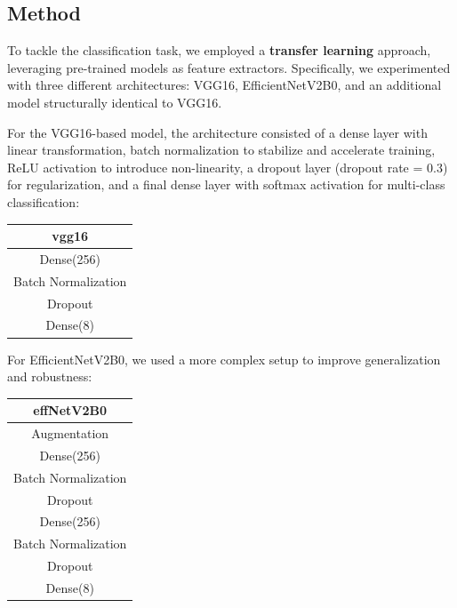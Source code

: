 \documentclass[11pt]{article}
\begin{document}
\begin{multicols*}{2}

        \section{Method}
        
        To tackle the classification task, we employed a \textbf{transfer learning} approach, leveraging pre-trained models as feature extractors. Specifically, we experimented with three different architectures: VGG16, EfficientNetV2B0, and an additional model structurally identical to VGG16.
        
        For the VGG16-based model, the architecture consisted of a dense layer with linear transformation, batch normalization to stabilize and accelerate training, ReLU activation to introduce non-linearity, a dropout layer (dropout rate = 0.3) for regularization, and a final dense layer with softmax activation for multi-class classification:

        \begin{center}
        \begin{tabular}{c}
        \toprule
        vgg16\\
        \hline
        Dense(256)\\
        Batch Normalization\\
        Dropout\\
        Dense(8)\\
        \bottomrule
        \end{tabular}
        \end{center}

        For EfficientNetV2B0, we used a more complex setup to improve generalization and robustness:

        \begin{center}
        \begin{tabular}{c}
        \toprule
        effNetV2B0\\
        \hline
        Augmentation\\
        Dense(256)\\
        Batch Normalization\\
        Dropout\\
        Dense(256)\\
        Batch Normalization\\
        Dropout\\
        Dense(8)\\
        \bottomrule
        \end{tabular}
        \end{center}
        

\end{multicols*}
\end{document}
